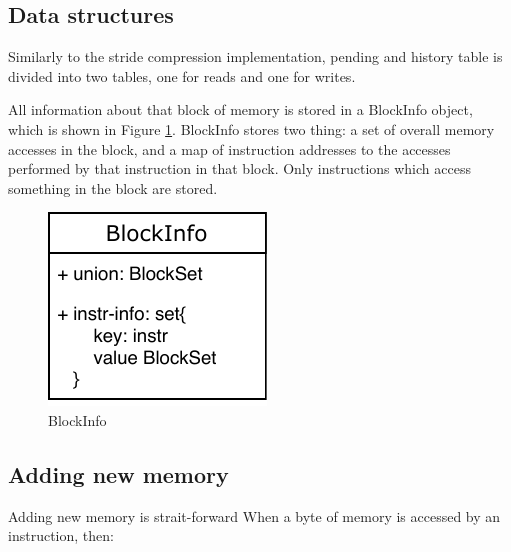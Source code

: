\documentclass[12pt,twoside]{reedthesis}
\begin{document}
			\subsection{Data structures}
			
			Similarly to the stride compression implementation, pending and history table is divided into two tables, one for reads and one for writes. %
			
			
			All information about that block of memory is stored in a BlockInfo object, which is shown in Figure \ref{fig:block-data}. BlockInfo stores two thing: a set of overall memory accesses in the block, and a map of instruction addresses to the accesses performed by that instruction in that block. Only instructions which access something in the block are stored.

		
			\begin{figure}[h]
				\caption{BlockInfo}
				\label{fig:block-data}
				\includegraphics[scale=1.0]{block-info.pdf}
			\end{figure}
%						
%			
			
			\subsection{Adding new memory}
			
			Adding new memory is strait-forward
			When a byte of memory is accessed by an instruction, then:
			
\end{document}
